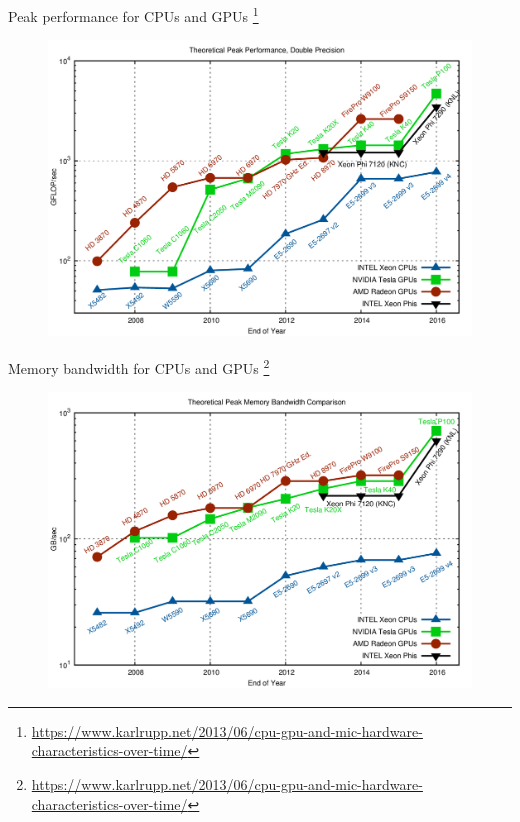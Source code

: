 \documentclass[@BEAMER_OPTIONS@]{beamer}
\newcommand{\www}[1]{\href{#1}{#1}}
\begin{document}
\begin{frame}{Peak performance for CPUs and GPUs%
    \footnote{\www{https://www.karlrupp.net/2013/06/cpu-gpu-and-mic-hardware-characteristics-over-time/}}}
    \begin{figure}
        \includegraphics[height=0.8\textheight]{gflops-dp.png}
    \end{figure}
\end{frame}

\begin{frame}{Memory bandwidth for CPUs and GPUs%
    \footnote{\www{https://www.karlrupp.net/2013/06/cpu-gpu-and-mic-hardware-characteristics-over-time/}}}
    \begin{figure}
        \includegraphics[height=0.8\textheight]{mem-bw.png}
    \end{figure}
\end{frame}
\end{document}
